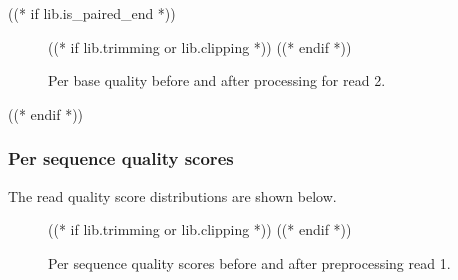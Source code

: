 ((* if lib.is_paired_end *))
    \begin{figure}[h!]
        \centering
        \begin{minipage}[b]{0.48\textwidth}
            \centering
        \end{minipage}
        \begin{minipage}[b]{0.48\textwidth}
            \centering
            ((* if lib.trimming or lib.clipping *))
            ((* endif *))
        \end{minipage}
        \caption{Per base quality before and after processing for read 2.}
    \end{figure}
((* endif *))

\subsubsection{Per sequence quality scores}
    The read quality score distributions are shown below.
    \begin{figure}[h!]
        \centering
        \begin{minipage}[b]{0.48\textwidth}
            \centering
        \end{minipage}
        \begin{minipage}[b]{0.48\textwidth}
            \centering
            ((* if lib.trimming or lib.clipping *))
            ((* endif *))
        \end{minipage}
        \caption{Per sequence quality scores before and after preprocessing read 1.}
    \end{figure}

